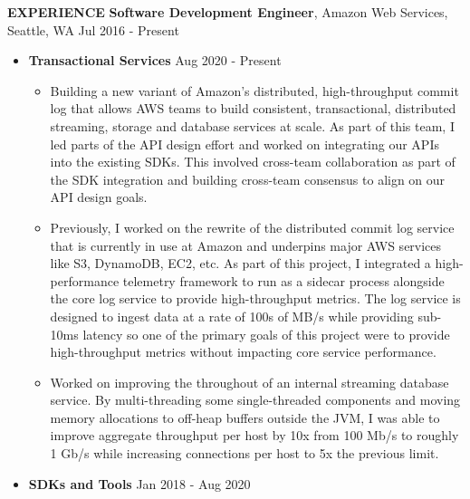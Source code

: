 \documentclass[10pt, letterpaper]{article}
\begin{document}
\textbf{EXPERIENCE}
\smallskip
\newline
\textbf{Software Development Engineer}, Amazon Web Services, Seattle, WA \hfill Jul 2016 - Present
\begin{itemize}
\item \textbf{Transactional Services} \hfill Aug 2020 - Present
  \begin{itemize}[label=$\bullet$]
  \item Building a new variant of Amazon's distributed, high-throughput commit log that allows AWS teams to build consistent, transactional, distributed streaming, storage and database services at scale. As part of this team, I led parts of the API design effort and worked on integrating our APIs into the existing SDKs. This involved cross-team collaboration as part of the SDK integration and building cross-team consensus to align on our API design goals.
  \item Previously, I worked on the rewrite of the distributed commit log service that is currently in use at Amazon and underpins major AWS services like S3, DynamoDB, EC2, etc. As part of this project, I integrated a high-performance telemetry framework to run as a sidecar process alongside the core log service to provide high-throughput metrics. The log service is designed to ingest data at a rate of 100s of MB/s while providing sub-10ms latency so one of the primary goals of this project were to provide high-throughput metrics without impacting core service performance.
  \item Worked on improving the throughout of an internal streaming database service. By multi-threading some single-threaded components and moving memory allocations to off-heap buffers outside the JVM, I was able to improve aggregate throughput per host by 10x from 100 Mb/s to roughly 1 Gb/s while increasing connections per host to 5x the previous limit. 
  \end{itemize}
\item \textbf{SDKs and Tools} \hfill Jan 2018 - Aug 2020
  \begin{itemize}[label=$\bullet$]

\end{itemize}
\end{itemize}
\end{document}
